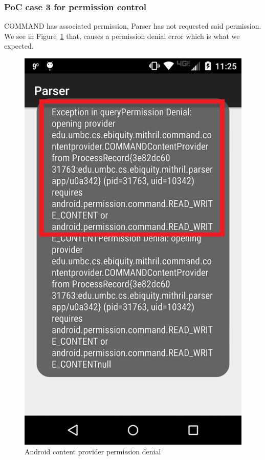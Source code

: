 \subsubsection{PoC case 3 for permission control} COMMAND has associated permission, Parser has not requested said permission. We see in Figure~\ref{fig:didNotRequestPermission} that, causes a permission denial error which is what we expected.
\begin{figure}[tb]
\centering
	\includegraphics[scale=0.18]{images/didNotRequestPermission}
	\caption{Android content provider permission denial}
	\label{fig:didNotRequestPermission}
\end{figure}

